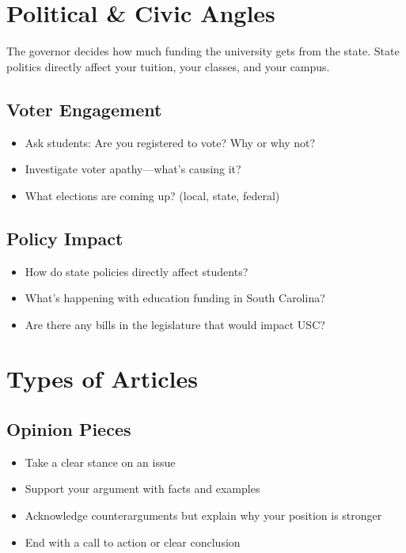 \documentclass[12pt]{article}
\begin{document}
\section*{Political \& Civic Angles}

\begin{tipbox}[Remember]
The governor decides how much funding the university gets from the state. State politics directly affect your tuition, your classes, and your campus.
\end{tipbox}

\subsection*{Voter Engagement}
\begin{itemize}[leftmargin=*]
    \item Ask students: Are you registered to vote? Why or why not?
    \item Investigate voter apathy---what's causing it?
    \item What elections are coming up? (local, state, federal)
\end{itemize}

\subsection*{Policy Impact}
\begin{itemize}[leftmargin=*]
    \item How do state policies directly affect students?
    \item What's happening with education funding in South Carolina?
    \item Are there any bills in the legislature that would impact USC?
\end{itemize}

\section*{Types of Articles}

\subsection*{Opinion Pieces}
\begin{itemize}[leftmargin=*]
    \item Take a clear stance on an issue
    \item Support your argument with facts and examples
    \item Acknowledge counterarguments but explain why your position is stronger
    \item End with a call to action or clear conclusion
\end{itemize}
\end{document}
